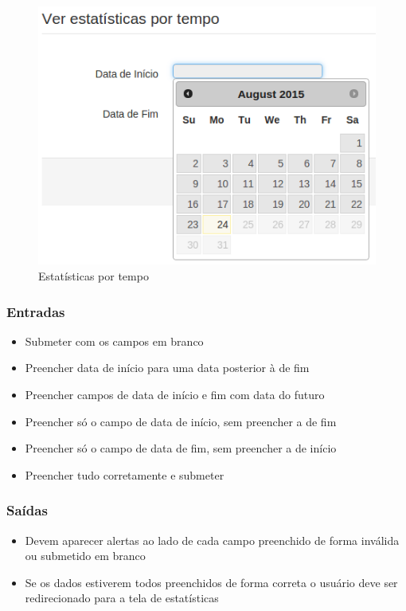 \begin{figure}[ht]
     \centering
     \includegraphics[scale=0.5]{images/estatisticatempo.png}
     \caption{Estatísticas por tempo}
     \label{fig:estempo}
\end{figure}

\subsubsection{Entradas}

\begin{itemize}

    \item Submeter com os campos em branco
	\item Preencher data de início para uma data posterior à de fim
	\item Preencher campos de data de início e fim com data do futuro
	\item Preencher só o campo de data de início, sem preencher a de fim
	\item Preencher só o campo de data de fim, sem preencher a de início
	\item Preencher tudo corretamente e submeter
	
\end{itemize}

\subsubsection{Saídas}

\begin{itemize}

	\item Devem aparecer alertas ao lado de cada campo preenchido de forma inválida ou submetido em branco
	\item Se os dados estiverem todos preenchidos de forma correta o usuário deve ser redirecionado para a tela de estatísticas
	
\end{itemize}


